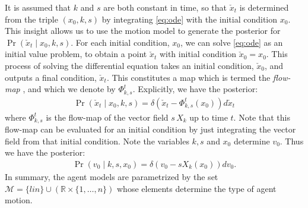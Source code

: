\documentclass[letterpaper,10pt,conference]{ieeetran}
\begin{document}
It is assumed that $k$ and $s$ are both constant in time, so that $\check{x}_t$ is determined from the triple $(x_0,k,s)$ by integrating \eqref{eq:ode} with the initial condition $x_0$.
This insight allows us to use the motion model to generate the posterior for $\Pr( \check{x}_t \mid x_0, k, s)$.
For each initial condition, $x_0$, we can solve \eqref{eq:ode} as an initial value problem, to obtain a point $\check{x}_t$ with initial condition $\check{x}_0 = x_0$.
This process of solving the differential equation takes an initial condition, $\check{x}_0$, and outputs a final condition, $\check{x}_t$.
This constitutes a map which is termed the \emph{flow-map} \cite[Ch 4]{MTA}, and which we denote by $\Phi_{k,s}^t$.
Explicitly, we have the posterior:
\begin{align}
	\Pr( \check{x}_t \mid x_0 , k , s) = \delta( \check{x}_t - \Phi^{t}_{k,s}( x_0) )  d\check{x}_t \label{eq:x_check | ksx}
\end{align}
where $\Phi^{t}_{k,s}$ is the flow-map of the vector field $s \,X_k$ up to time $t$.
Note that this flow-map can be evaluated for an initial condition by just integrating the vector field from that initial condition.
Note the variables $k,s$ and $x_0$ determine $v_0$.
Thus we have the posterior:
\begin{align}
	\Pr( v_0 \mid k, s, x_0) = \delta( v_0 -s X_k( x_0) ) dv_0. \label{eq:v | ksx}
\end{align}
In summary, the agent models are parametrized by the set $\mathcal{M} = \{ lin \} \cup \left( \mathbb{R} \times \{ 1 , \dots, n \} \right)$ whose elements determine the type of agent motion.
\end{document}
